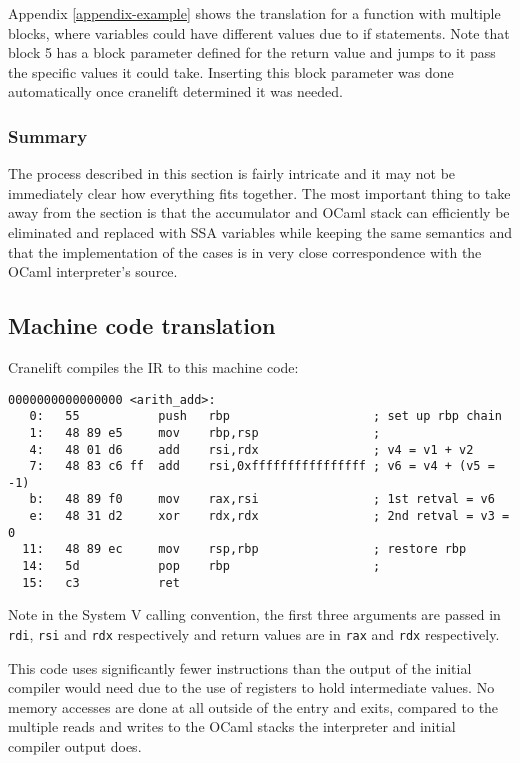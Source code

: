 Appendix \ref{appendix-example} shows the translation for a function with multiple blocks, where
variables could have different values due to if statements.  Note that block 5 has a block
parameter defined for the return value and jumps to it pass the specific values it could take.
Inserting this block parameter was done automatically once cranelift determined it was needed.

\subsubsection{Summary}

The process described in this section is fairly intricate and it may not be immediately clear how
everything fits together. The most important thing to take away from the section is that the
accumulator and OCaml stack can efficiently be eliminated and replaced with SSA variables while
keeping the same semantics and that the implementation of the cases is in very close correspondence
with the OCaml interpreter's source.

\subsection{Machine code translation}

Cranelift compiles the IR to this machine code:

\begin{verbatim}
0000000000000000 <arith_add>:
   0:	55           push   rbp                    ; set up rbp chain
   1:	48 89 e5     mov    rbp,rsp                ;  
   4:	48 01 d6     add    rsi,rdx                ; v4 = v1 + v2
   7:	48 83 c6 ff  add    rsi,0xffffffffffffffff ; v6 = v4 + (v5 = -1)
   b:	48 89 f0     mov    rax,rsi                ; 1st retval = v6
   e:	48 31 d2     xor    rdx,rdx                ; 2nd retval = v3 = 0
  11:	48 89 ec     mov    rsp,rbp                ; restore rbp
  14:	5d           pop    rbp                    ;
  15:	c3           ret    
\end{verbatim}

Note in the System V calling convention, the first three arguments are passed in \texttt{rdi},
\texttt{rsi} and \texttt{rdx} respectively and return values are in \texttt{rax} and
\texttt{rdx} respectively.

This code uses significantly fewer instructions than the output of the initial compiler would need
due to the use of registers to hold intermediate values. No memory accesses are
done at all outside of the entry and exits, compared to the multiple reads and writes to the OCaml
stacks the interpreter and initial compiler output does.

